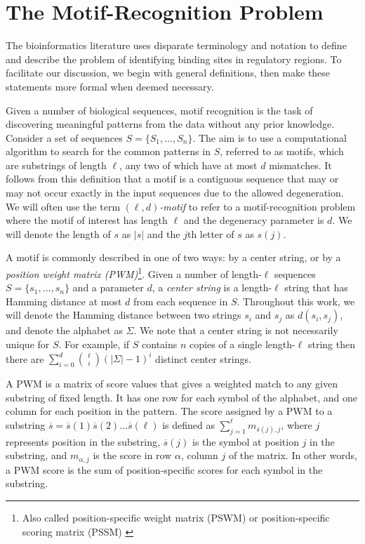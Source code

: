 \section{The Motif-Recognition Problem}
 
The bioinformatics literature uses disparate terminology and notation to define and describe the problem of identifying binding sites in regulatory regions.  To facilitate our discussion, we begin with general definitions, then make these statements more formal when deemed necessary. 

Given a number of biological sequences, motif recognition is the task of discovering meaningful patterns from the data without any prior knowledge.  Consider a set of sequences $S = \{S_1, \ldots, S_n\}$.  The aim is to use a computational algorithm to search for the common patterns in $S$, referred to as motifs, which are substrings of length $\ell$, any two of which have at most $d$ mismatches. It follows from this definition that a motif is a contiguous sequence that may or may not occur exactly in the input sequences due to the allowed degeneration.    We will often use the term $(\ell, d)${\em -motif} to refer to a motif-recognition problem where the motif of interest has length $\ell$ and the degeneracy parameter is $d$.  We will denote the length of $s$ as $|s|$ and the $j$th letter of $s$ as $s(j)$.

A motif is commonly described in one of two ways: by a center string, or by a {\em position weight matrix (PWM)}\footnote{Also called position-specific weight matrix (PSWM) or position-specific scoring matrix (PSSM) \cite{pwm_reference,dong}}. Given a number of length-$\ell$ sequences $S = \{s_1, \ldots, s_n\}$ and a parameter $d$, a {\em center string} is a length-$\ell$ string that has Hamming distance at most $d$ from each sequence in $S$.   Throughout this work, we will denote the Hamming distance between two strings $s_i$ and $s_j$ as $d(s_i, s_j)$, and denote the alphabet as $\Sigma$.  We note that a center string is not necessarily unique for $S$. For example, if $S$ contains $n$ copies of a single length-$\ell$ string then there are $\sum_{i = 0}^{d} {\ell \choose i} (|\Sigma| - 1)^i$ distinct center strings.  

A PWM is a matrix of score values that gives a weighted match to any given substring of fixed length. It has one row for each symbol of the alphabet, and one column for each position in the pattern. The score assigned by a PWM to a substring $\overline{s} = \overline{s}(1) \overline{s}(2) \ldots \overline{s}(\ell)$ is defined as $\sum_{j =1}^{\ell} m_{\overline{s}(j), j}$, where $j$ represents position in the substring, $\overline{s}(j)$ is the symbol at position $j$ in the substring, and $m_{\alpha, j}$ is the score in row $\alpha$, column $j$ of the matrix. In other words, a PWM score is the sum of position-specific scores for each symbol in the substring.

